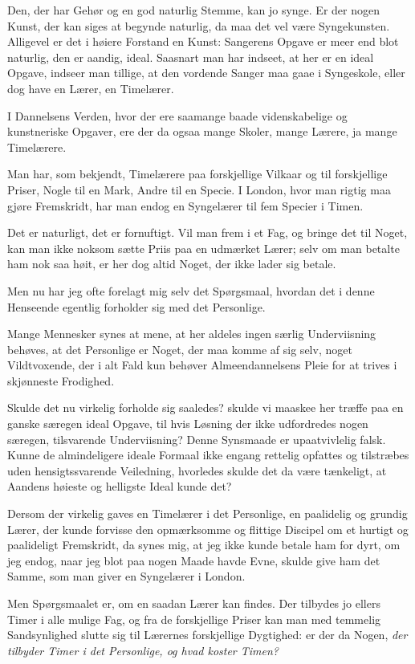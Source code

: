 \documentclass[12pt,a4paper]{book}
\newcommand{\apage}[1]{\marginnote{\footnotesize\textit{[#1]}}}
\begin{document}
Den, der har Gehør og en god naturlig Stemme, kan jo synge. Er der
nogen Kunst, der kan siges at begynde naturlig, da maa det vel være
Syngekunsten. Alligevel er det i høiere Forstand en Kunst: Sangerens
Opgave er meer end blot naturlig, den er aandig, ideal. Saasnart man
har indseet, at her er en ideal Opgave, indseer man tillige, at den
vordende Sanger maa gaae i Syngeskole, eller dog have en Lærer, en
Timelærer.

I \apage{81} Dannelsens Verden, hvor der ere saamange baade videnskabelige og
kunstneriske Opgaver, ere der da ogsaa mange Skoler, mange Lærere,
ja mange Timelærere.

Man har, som bekjendt, Timelærere paa forskjellige Vilkaar og til
forskjellige Priser, Nogle til en Mark, Andre til en Specie. I
London, hvor man rigtig maa gjøre Fremskridt, har man endog en
Syngelærer til fem Specier i Timen.

Det er naturligt, det er fornuftigt. Vil man frem i et Fag, og
bringe det til Noget, kan man ikke noksom sætte Priis paa en
udmærket Lærer; selv om man betalte ham nok saa høit, er her dog
altid Noget, der ikke lader sig betale.

Men nu har jeg ofte forelagt mig selv det Spørgsmaal, hvordan det i
denne Henseende egentlig forholder sig med det Personlige.

Mange Mennesker synes at mene, at her aldeles ingen særlig
Underviisning behøves, at det Personlige er Noget, der maa komme af
sig selv, noget Vildtvoxende, der i alt Fald kun behøver
Almeendannelsens Pleie for at trives i skjønneste Frodighed.

Skulde det nu virkelig forholde sig saaledes? skulde vi maaskee her
træffe paa en ganske særegen ideal Opgave, til hvis Løsning der
ikke udfordredes nogen særegen, tilsvarende Underviisning? Denne
Synsmaade er upaatvivlelig falsk. Kunne de almindeligere ideale
Formaal ikke engang rettelig opfattes og tilstræbes uden
hensigtssvarende Veiledning, hvorledes skulde det da være
tænkeligt, at Aandens høieste og helligste Ideal kunde det?

Dersom der virkelig gaves en Timelærer i det Personlige, en
paalidelig og grundig Lærer, der kunde forvisse den opmærksomme og
flittige Discipel om et hurtigt og paalideligt Fremskridt, da synes
mig, at jeg ikke kunde betale ham for dyrt, om jeg endog, naar jeg
blot paa nogen Maade havde Evne, skulde give ham det Samme, som man
giver en Syngelærer i London. \apage{82}

Men Spørgsmaalet er, om en saadan Lærer kan findes. Der tilbydes jo
ellers Timer i alle mulige Fag, og fra de forskjellige Priser kan
man med temmelig Sandsynlighed slutte sig til Lærernes forskjellige
Dygtighed: er der da Nogen, \emph{der tilbyder Timer i det
Personlige, og hvad koster Timen?}
\end{document}
